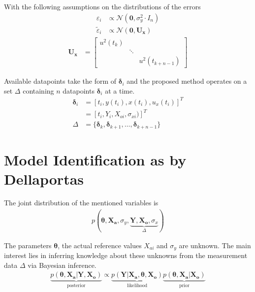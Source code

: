 \documentclass[10pt]{article}
\renewcommand{\vec}[1]{\boldsymbol{#1}}
\newcommand{\mat}[1]{\boldsymbol{#1}}
\begin{document}
With the following assumptions on the distributions of the errors
\begin{align}
    \varepsilon_i &\propto \mathcal{N}(\vec{0}, \sigma_y^2 \cdot I_n)\\
    \tilde{\varepsilon}_i &\propto \mathcal{N}(\vec{0}, \mat{U_x}) 
\end{align}
\begin{align}
    \mat{U_x} &= \begin{bmatrix} u^2(t_k) && \\ &\ddots& \\ && u^2(t_{k+n-1}) \end{bmatrix} 
\end{align}

Available datapoints take the form of $\vec{\delta}_i$ and the proposed method operates on a set $\Delta$ containing $n$ datapoints $\vec{\delta}_i$ at a time.
\begin{align}
    \vec{\delta}_i &= [t_i, y(t_i), x(t_i), u_x(t_i)]^T \nonumber \\
                 &= [t_i, Y_i, X_{oi}, \sigma_{xi})]^T \\
    \Delta &= \{\vec{\delta}_k, \vec{\delta}_{k+1}, \dots,  \vec{\delta}_{k+n-1}\} 
\end{align}


\section{Model Identification as by Dellaportas}
The joint distribution of the mentioned variables is
\begin{align}
    p(\vec{\theta}, \vec{X_a}, \sigma_y, \underbrace{\vec{Y}, \vec{X_o}, \sigma_x}_{\Delta})
\end{align}

The parameters $\vec{\theta}$, the actual reference values $X_{ai}$ and $\sigma_{y}$ are unknown.
The main interest lies in inferring knowledge about these unknowns from the measurement data $\Delta$ via Bayesian inference.
\begin{align}
    \underbrace{p(\vec{\theta}, \vec{X_a} | \vec{Y}, \vec{X_o})}_{\text{posterior}} \propto \underbrace{p(\vec{Y} | \vec{X_a}, \vec{\theta}, \vec{X_o})}_{\text{likelihood}} \underbrace{p(\vec{\theta}, \vec{X_a} | \vec{X_o})}_{\text{prior}}
\end{align}
\end{document}
